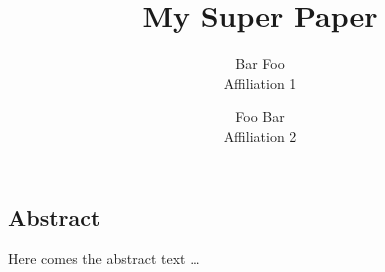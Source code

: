 \documentclass[letterpaper,twocolumn,10pt]{article}
\begin{document}
\date{}

\title{\Large \bf My Super Paper}

\author{
{\rm Bar Foo}\\
Affiliation 1
\and
{\rm Foo Bar}\\
Affiliation 2
}

\maketitle


\subsection*{Abstract}

Here comes the abstract text \ldots
\end{document}
